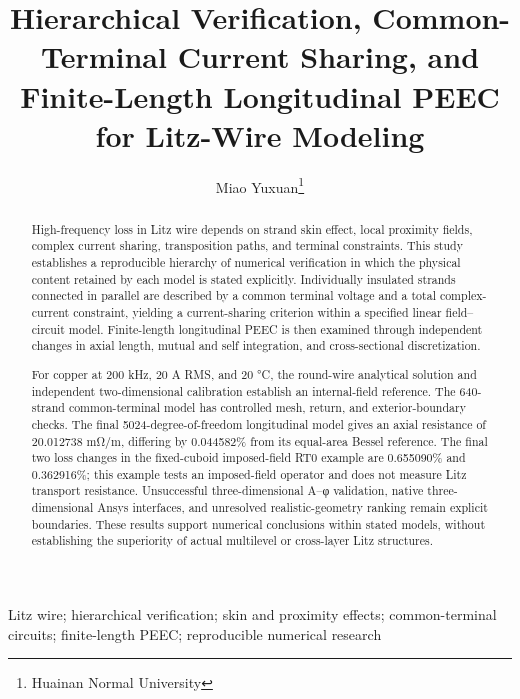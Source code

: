 \documentclass[journal,10pt]{IEEEtran}
\title{Hierarchical Verification, Common-Terminal Current Sharing, and Finite-Length Longitudinal PEEC for Litz-Wire Modeling}
\author{Miao Yuxuan\thanks{Huainan Normal University}}
\date{}
\begin{document}
\maketitle
\begin{abstract}
High-frequency loss in Litz wire depends on strand skin effect, local proximity fields, complex current sharing, transposition paths, and terminal constraints. This study establishes a reproducible hierarchy of numerical verification in which the physical content retained by each model is stated explicitly. Individually insulated strands connected in parallel are described by a common terminal voltage and a total complex-current constraint, yielding a current-sharing criterion within a specified linear field–circuit model. Finite-length longitudinal PEEC is then examined through independent changes in axial length, mutual and self integration, and cross-sectional discretization.

For copper at 200 kHz, 20 A RMS, and 20 °C, the round-wire analytical solution and independent two-dimensional calibration establish an internal-field reference. The 640-strand common-terminal model has controlled mesh, return, and exterior-boundary checks. The final 5024-degree-of-freedom longitudinal model gives an axial resistance of 20.012738 mΩ/m, differing by 0.044582\% from its equal-area Bessel reference. The final two loss changes in the fixed-cuboid imposed-field RT0 example are 0.655090\% and 0.362916\%; this example tests an imposed-field operator and does not measure Litz transport resistance. Unsuccessful three-dimensional A–φ validation, native three-dimensional Ansys interfaces, and unresolved realistic-geometry ranking remain explicit boundaries. These results support numerical conclusions within stated models, without establishing the superiority of actual multilevel or cross-layer Litz structures.
\end{abstract}
\begin{IEEEkeywords}
Litz wire; hierarchical verification; skin and proximity effects; common-terminal circuits; finite-length PEEC; reproducible numerical research
\end{IEEEkeywords}









\renewcommand{\refname}{References}

\end{document}

